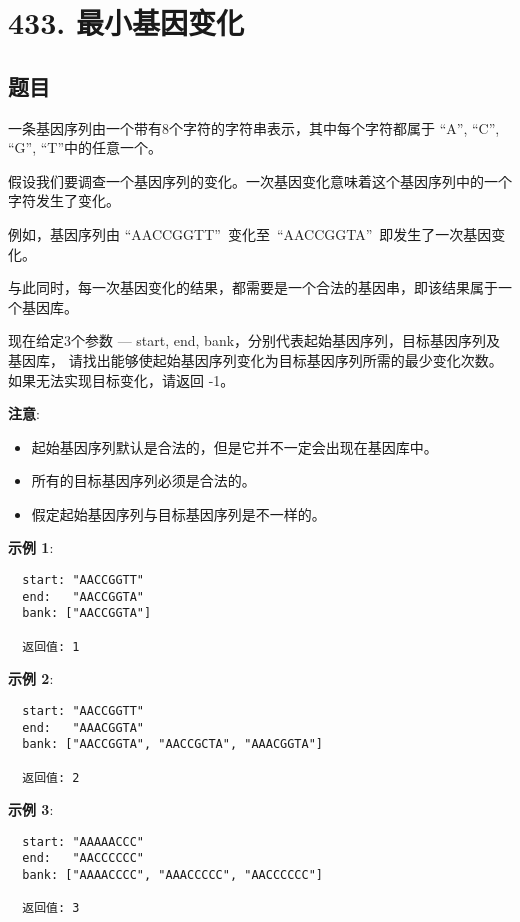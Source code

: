 \newpage
\section{433. 最小基因变化}
\label{leetcode:433}

\subsection{题目}

一条基因序列由一个带有8个字符的字符串表示，其中每个字符都属于 
``A'', ``C'', ``G'', ``T''中的任意一个。

假设我们要调查一个基因序列的变化。一次基因变化意味着这个基因序列中的一个字符发生了变化。

例如，基因序列由 ``AACCGGTT'' 变化至 ``AACCGGTA'' 即发生了一次基因变化。

与此同时，每一次基因变化的结果，都需要是一个合法的基因串，即该结果属于一个基因库。

现在给定3个参数 — start, end, bank，分别代表起始基因序列，目标基因序列及基因库，
请找出能够使起始基因序列变化为目标基因序列所需的最少变化次数。
如果无法实现目标变化，请返回 -1。

\textbf{注意}:

\begin{itemize}
  \item 起始基因序列默认是合法的，但是它并不一定会出现在基因库中。
  \item 所有的目标基因序列必须是合法的。
  \item 假定起始基因序列与目标基因序列是不一样的。
\end{itemize}

\textbf{示例 1}:

\begin{verbatim}
  start: "AACCGGTT"
  end:   "AACCGGTA"
  bank: ["AACCGGTA"]

  返回值: 1
\end{verbatim}

\textbf{示例 2}:

\begin{verbatim}
  start: "AACCGGTT"
  end:   "AAACGGTA"
  bank: ["AACCGGTA", "AACCGCTA", "AAACGGTA"]

  返回值: 2
\end{verbatim}

\textbf{示例 3}:

\begin{verbatim}
  start: "AAAAACCC"
  end:   "AACCCCCC"
  bank: ["AAAACCCC", "AAACCCCC", "AACCCCCC"]

  返回值: 3
\end{verbatim}

